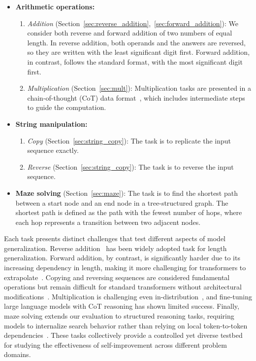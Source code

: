 \begin{itemize}[left=10pt]
\item \textbf{Arithmetic operations:} 
\begin{enumerate} 
\item \textit{Addition} (Section~\ref{sec:reverse_addition},~\ref{sec:forward_addition}):  We consider both reverse and forward addition of two numbers of equal length. In reverse addition, both operands and the answers are reversed, so they are written with the least significant digit first. Forward addition, in contrast, follows the standard format, with the most significant digit first.%
\item \textit{Multiplication} (Section~\ref{sec:mult}): Multiplication tasks are presented in a chain-of-thought (CoT) data format~\citep{deng2024explicit}, which includes intermediate steps to guide the computation. %
\end{enumerate}
\item \textbf{String manipulation:} 
\begin{enumerate} 
\item \textit{Copy} (Section~\ref{sec:string_copy}): The task is to replicate the input sequence exactly. %
\item \textit{Reverse} (Section~\ref{sec:string_copy}): The task is to reverse the input sequence.
\end{enumerate} 
\item \textbf{Maze solving} (Section~\ref{sec:maze}): The task is to find the shortest path between a start node and an end node in a tree-structured graph. The shortest path is defined as the path with the fewest number of hops, where each hop represents a transition between two adjacent nodes.
\end{itemize}

Each task presents distinct challenges that test different aspects of model generalization. Reverse addition~\citep{lee2023teaching} has been widely adopted task for length generalization. Forward addition, by contrast, is significantly harder due to its increasing dependency in length, making it more challenging for transformers to extrapolate~\citep{zhou2023algorithms}. Copying and reversing sequences are considered fundamental operations but remain difficult for standard transformers without architectural modifications~\citep{anil2022exploring,zhou2023algorithms}. Multiplication is challenging even in-distribution~\citep{dziri2024faith}, and fine-tuning large language models with CoT reasoning has shown limited success. Finally, maze solving extends our evaluation to structured reasoning tasks, requiring models to internalize search behavior rather than relying on local token-to-token dependencies~\citep{bachmann2024pitfalls}. These tasks collectively provide a controlled yet diverse testbed for studying the effectiveness of self-improvement across different problem domains.

